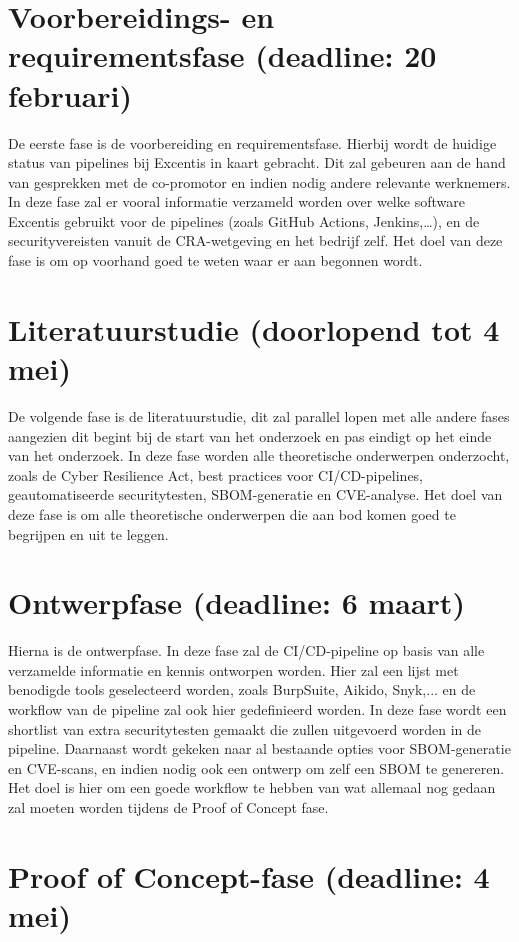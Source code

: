 \section{Voorbereidings- en requirementsfase (deadline: 20 februari)}

De eerste fase is de voorbereiding en requirementsfase. Hierbij wordt de huidige status van pipelines bij Excentis in kaart gebracht. Dit zal gebeuren aan de hand van gesprekken met de co-promotor en indien nodig andere relevante werknemers. In deze fase zal er vooral informatie verzameld worden over welke software Excentis gebruikt voor de pipelines (zoals GitHub Actions, Jenkins,…), en de securityvereisten vanuit de CRA-wetgeving en het bedrijf zelf. Het doel van deze fase is om op voorhand goed te weten waar er aan begonnen wordt.

\section{Literatuurstudie (doorlopend tot 4 mei)}

De volgende fase is de literatuurstudie, dit zal parallel lopen met alle andere fases aangezien dit begint bij de start van het onderzoek en pas eindigt op het einde van het onderzoek. In deze fase worden alle theoretische onderwerpen onderzocht, zoals de Cyber Resilience Act, best practices voor CI/CD-pipelines, geautomatiseerde securitytesten, SBOM-generatie en CVE-analyse. Het doel van deze fase is om alle theoretische onderwerpen die aan bod komen goed te begrijpen en uit te leggen.

\section{Ontwerpfase (deadline: 6 maart)}

Hierna is de ontwerpfase. In deze fase zal de CI/CD-pipeline op basis van alle verzamelde informatie en kennis ontworpen worden. Hier zal een lijst met benodigde tools geselecteerd worden, zoals BurpSuite, Aikido, Snyk,... en de workflow van de pipeline zal ook hier gedefinieerd worden. In deze fase wordt een shortlist van extra securitytesten gemaakt die zullen uitgevoerd worden in de pipeline. Daarnaast wordt gekeken naar al bestaande opties voor SBOM-generatie en CVE-scans, en indien nodig ook een ontwerp om zelf een SBOM te genereren. Het doel is hier om een goede workflow te hebben van wat allemaal nog gedaan zal moeten worden tijdens de Proof of Concept fase.

\section{Proof of Concept-fase (deadline: 4 mei)}

